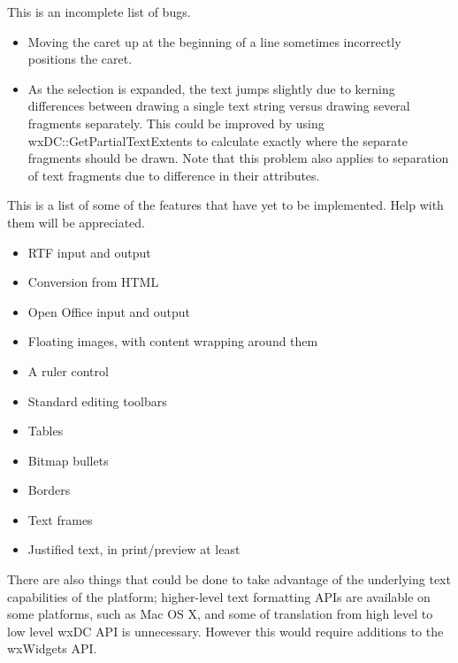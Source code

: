 This is an incomplete list of bugs.

\begin{itemize}\itemsep=0pt
\item Moving the caret up at the beginning of a line sometimes incorrectly positions the
caret.
\item As the selection is expanded, the text jumps slightly due to kerning differences between
drawing a single text string versus drawing several fragments separately. This could
be improved by using wxDC::GetPartialTextExtents to calculate exactly where the separate fragments
should be drawn. Note that this problem also applies to separation of text fragments due to difference in their attributes.
\end{itemize}


This is a list of some of the features that have yet to be implemented. Help with them will be appreciated.

\begin{itemize}\itemsep=0pt
\item RTF input and output
\item Conversion from HTML
\item Open Office input and output
\item Floating images, with content wrapping around them
\item A ruler control
\item Standard editing toolbars
\item Tables
\item Bitmap bullets
\item Borders
\item Text frames
\item Justified text, in print/preview at least
\end{itemize}

There are also things that could be done to take advantage of the underlying text capabilities of the platform;
higher-level text formatting APIs are available on some platforms, such as Mac OS X, and some of translation from
high level to low level wxDC API is unnecessary. However this would require additions to the wxWidgets API.

